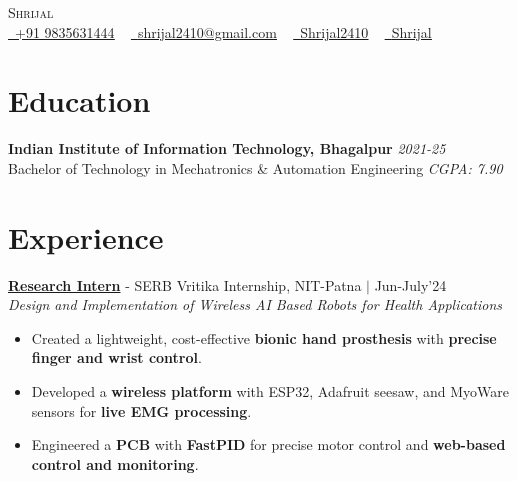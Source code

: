 \documentclass[letterpaper,11pt]{article}
\begin{document}
\begin{center}
	{\Huge \scshape Shrijal} \\[4pt]
	\href{tel:9835631444}{\color{MidnightBlue}\raisebox{-0.2\height}\faMobile\ \underline{+91 9835631444}} ~
	\href{mailto:shrijal2410@gmail.com}{\color{MidnightBlue}\raisebox{-0.2\height}\faEnvelope\ \underline{shrijal2410@gmail.com}} ~ 
	\href{https://github.com/Shrijal2410}{\color{MidnightBlue}\raisebox{-0.2\height}\faGithub\ \underline{Shrijal2410}} ~
	\href{https://www.linkedin.com/in/shrijal2410/}{\color{MidnightBlue}\raisebox{-0.2\height}\faLinkedin\ \underline{Shrijal}}
\end{center}

\vspace{-8pt}

\section{Education}
\textbf{Indian Institute of Information Technology, Bhagalpur} \hfill \textit{2021-25} \\
Bachelor of Technology in Mechatronics \& Automation Engineering \hfill \textit{CGPA: 7.90}

\section{Experience}
\textbf{{\color{MidnightBlue} \underline{Research Intern}}} - SERB Vritika Internship, NIT-Patna $|$ \emph{\color{MidnightBlue} \href{https://drive.google.com/file/d/1oEHWZM_ERbbupA4weyQR6Hkh8ErDQOe8/view?usp=sharing}{\faGoogleDrive}} \hfill Jun-July'24 \\
\textit{Design and Implementation of Wireless AI Based Robots for Health Applications}
\begin{itemize}[leftmargin=*,noitemsep,topsep=-2pt]
	\item Created a lightweight, cost-effective \textbf{bionic hand prosthesis} with \textbf{precise finger and wrist control}.
	\item Developed a \textbf{wireless platform} with ESP32, Adafruit seesaw, and MyoWare sensors for \textbf{live EMG processing}.
	\item Engineered a \textbf{PCB} with \textbf{FastPID} for precise motor control and \textbf{web-based control and monitoring}.
\end{itemize}
\end{document}

